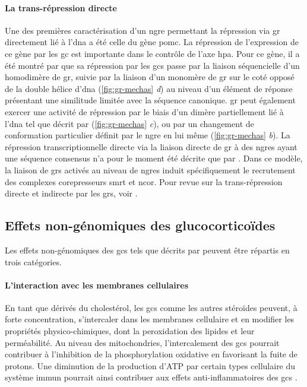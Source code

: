 \documentclass[../main.tex]{subfiles}
\begin{document}
\paragraph{La trans-répression directe}
Une des premières caractérisation d'un \gls{ngre} permettant la répression via \gls{gr} directement lié à l'\gls{dna} a été celle du gène \gls{pomc}.
La répression de l'expression de ce gène par les \gls{gc} est importante dans le contrôle de l'axe \gls{hpa}.
Pour ce gène, il a été montré par \citet{Drouin1993} que sa répression par les \glspl{gc} passe par la liaison séquencielle d'un homodimère de \gls{gr}, suivie par la liaison d'un monomère de \gls{gr} sur le coté opposé de la double hélice d'\gls{dna} (\autoref{fig:gr-mechas} \textit{d}) au niveau d'un élément de réponse présentant une similitude limitée avec la séquence canonique.
\gls{gr} peut également exercer une activité de répression par le biais d'un dimère partiellement lié à l'\gls{dna} tel que décrit par \citet{Lefstin1998} (\autoref{fig:gr-mechas} \textit{c}), ou par un changement de conformation particulier définit par le \gls{ngre} en lui même (\autoref{fig:gr-mechas} \textit{b}).
La répression transcriptionnelle directe via la liaison directe de \gls{gr} à des \glspl{ngre} ayant une séquence consensus n'a pour le moment été décrite que par \citet{Surjit2011}.
Dans ce modèle, la liaison de \glspl{gr} activés au niveau de \glspl{ngre} induit spécifiquement le recrutement des complexes corepresseurs \gls{smrt} et \gls{ncor}.
Pour revue sur la trans-répression directe et indirecte par les \glspl{gr}, voir \citet{Dostert2004}.

\subsection{Effets non-génomiques des glucocorticoïdes}
Les effets non-génomiques des \glspl{gc} tels que décrits par \citet{Stahn2008a} peuvent être répartis en trois catégories.

\paragraph{L'interaction avec les membranes cellulaires}
En tant que dérivés du cholestérol, les \glspl{gc} comme les autres stéroïdes peuvent, à forte concentration, s'intercaler dans les membranes cellulaire et en modifier les propriétés physico-chimiques, dont la peroxidation des lipides et leur perméabilité.
Au niveau des mitochondries, l'intercalement des \glspl{gc} pourrait contribuer à l'inhibition de la phosphorylation oxidative en favorisant la fuite de protons.
Une diminution de la production d'ATP par certain types cellulaire du système immun pourrait ainsi contribuer aux effets anti-inflammatoires des \glspl{gc} \citep{Buttgereit2002}.
\end{document}
